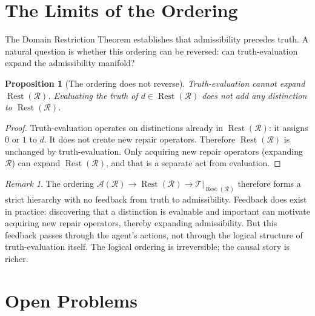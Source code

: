 \documentclass[12pt, oneside]{article}
\theoremstyle{plain}
\newtheorem{proposition}[theorem]{Proposition}
\theoremstyle{definition}
\theoremstyle{remark}
\newtheorem{remark}[theorem]{Remark}
\DeclareMathOperator{\Rest}{Rest}
\newcommand{\Tsub}{\mathcal{T}}
\newcommand{\RestR}{\Rest(\mathcal{R})}
\begin{document}
\section{The Limits of the Ordering}
\label{sec:limits}

The Domain Restriction Theorem establishes that admissibility
precedes truth.
A natural question is whether this ordering can be reversed:
can truth-evaluation expand the admissibility manifold?

\begin{proposition}[The ordering does not reverse]
  Truth-evaluation cannot expand $\RestR$.
  Evaluating the truth of $d \in \RestR$ does not add any
  distinction to $\RestR$.
  \label{prop:no-reversal}
\end{proposition}

\begin{proof}
  Truth-evaluation operates on distinctions already in
  $\RestR$: it assigns $0$ or $1$ to $d$.
  It does not create new repair operators.
  Therefore $\RestR$ is unchanged by truth-evaluation.
  Only acquiring new repair operators (expanding $\mathcal{R}$)
  can expand $\RestR$, and that is a separate act from evaluation.
\end{proof}

\begin{remark}
  The ordering $\mathcal{A}(\mathcal{R}) \to \RestR \to
  \Tsub|_{\RestR}$ therefore forms a strict hierarchy with no
  feedback from truth to admissibility.
  Feedback does exist in practice: discovering that a distinction
  is evaluable and important can motivate acquiring new repair
  operators, thereby expanding admissibility.
  But this feedback passes through the agent's actions, not through
  the logical structure of truth-evaluation itself.
  The logical ordering is irreversible; the causal story is richer.
\end{remark}


\section{Open Problems}
\label{sec:open}
\end{document}
